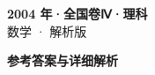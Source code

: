 \documentclass[zihao=-4, a4paper]{ctexart}
\begin{document}
\begin{center}
  {\Large\bfseries 2004 年·全国卷Ⅳ·理科}\\[4pt]
  {\large 数学 · 解析版}
\end{center}
\medskip
{}

\clearpage
{}
\begin{center}{\Large\bfseries 参考答案与详细解析}\end{center}
\medskip

\end{document}
